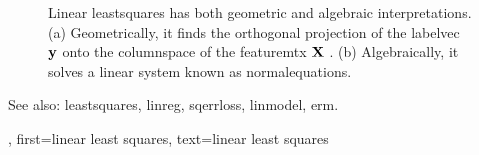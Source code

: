 {{\begin{figure}[H]
 		\caption{Linear \gls{leastsquares} has both geometric and algebraic interpretations. 
 			(a) Geometrically, it finds the orthogonal \gls{projection} of the 
 			\gls{labelvec} ${\bf y}$ onto the \gls{columnspace} of the 
 			\gls{featuremtx} ${\bf X}$ \cite[Ch. 8]{BoydConvexBook}. (b) Algebraically, it solves a linear system 
 			known as \gls{normalequations}. 
 			\label{fig_linleastsquares_dict}}
 		\end{figure}
		See also: \gls{leastsquares}, \gls{linreg}, \gls{sqerrloss}, \gls{linmodel}, \gls{erm}.},
	first={linear least squares},
	text={linear least squares}
}

